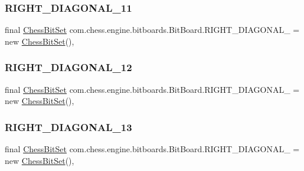 \subsubsection{\texorpdfstring{RIGHT\_DIAGONAL\_11}{RIGHT\_DIAGONAL\_11}}
{\footnotesize\ttfamily final \mbox{\hyperlink{classcom_1_1chess_1_1engine_1_1bitboards_1_1_chess_bit_set}{Chess\+Bit\+Set}} com.\+chess.\+engine.\+bitboards.\+Bit\+Board.\+R\+I\+G\+H\+T\+\_\+\+D\+I\+A\+G\+O\+N\+A\+L\+\_ = new \mbox{\hyperlink{classcom_1_1chess_1_1engine_1_1bitboards_1_1_chess_bit_set}{Chess\+Bit\+Set}}()\hspace{0.3cm}{\ttfamily [static]}, {\ttfamily [private]}}

\mbox{\label{classcom_1_1chess_1_1engine_1_1bitboards_1_1_bit_board_aa1d75d641bd102dd7d27c3b0fa5add6c}} 
\subsubsection{\texorpdfstring{RIGHT\_DIAGONAL\_12}{RIGHT\_DIAGONAL\_12}}
{\footnotesize\ttfamily final \mbox{\hyperlink{classcom_1_1chess_1_1engine_1_1bitboards_1_1_chess_bit_set}{Chess\+Bit\+Set}} com.\+chess.\+engine.\+bitboards.\+Bit\+Board.\+R\+I\+G\+H\+T\+\_\+\+D\+I\+A\+G\+O\+N\+A\+L\+\_ = new \mbox{\hyperlink{classcom_1_1chess_1_1engine_1_1bitboards_1_1_chess_bit_set}{Chess\+Bit\+Set}}()\hspace{0.3cm}{\ttfamily [static]}, {\ttfamily [private]}}

\mbox{\label{classcom_1_1chess_1_1engine_1_1bitboards_1_1_bit_board_af70e1d730430b970758ac86adc719a36}} 
\subsubsection{\texorpdfstring{RIGHT\_DIAGONAL\_13}{RIGHT\_DIAGONAL\_13}}
{\footnotesize\ttfamily final \mbox{\hyperlink{classcom_1_1chess_1_1engine_1_1bitboards_1_1_chess_bit_set}{Chess\+Bit\+Set}} com.\+chess.\+engine.\+bitboards.\+Bit\+Board.\+R\+I\+G\+H\+T\+\_\+\+D\+I\+A\+G\+O\+N\+A\+L\+\_ = new \mbox{\hyperlink{classcom_1_1chess_1_1engine_1_1bitboards_1_1_chess_bit_set}{Chess\+Bit\+Set}}()\hspace{0.3cm}{\ttfamily [static]}, {\ttfamily [private]}}

